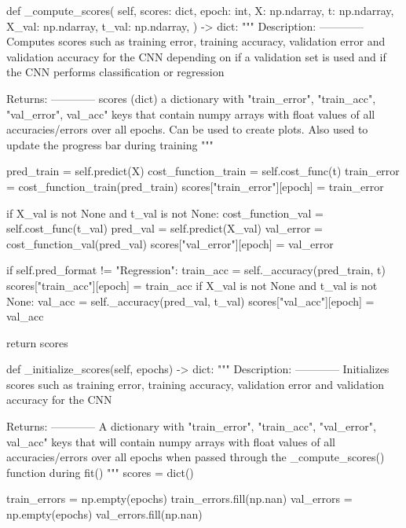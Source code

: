 \documentclass[%
oneside,                 %
final,                   %
10pt]{article}
\begin{document}
    def _compute_scores(
        self,
        scores: dict,
        epoch: int,
        X: np.ndarray,
        t: np.ndarray,
        X_val: np.ndarray,
        t_val: np.ndarray,
    ) -> dict:
        """
        Description:
        ------------
            Computes scores such as training error, training accuracy, validation error
            and validation accuracy for the CNN depending on if a validation set is used
            and if the CNN performs classification or regression

        Returns:
        ------------
            scores (dict) a dictionary with "train_error", "train_acc", "val_error", val_acc" keys
            that contain numpy arrays with float values of all accuracies/errors over all epochs.
            Can be used to create plots. Also used to update the progress bar during training
        """

        pred_train = self.predict(X)
        cost_function_train = self.cost_func(t)
        train_error = cost_function_train(pred_train)
        scores["train_error"][epoch] = train_error

        if X_val is not None and t_val is not None:
            cost_function_val = self.cost_func(t_val)
            pred_val = self.predict(X_val)
            val_error = cost_function_val(pred_val)
            scores["val_error"][epoch] = val_error

        if self.pred_format != "Regression":
            train_acc = self._accuracy(pred_train, t)
            scores["train_acc"][epoch] = train_acc
            if X_val is not None and t_val is not None:
                val_acc = self._accuracy(pred_val, t_val)
                scores["val_acc"][epoch] = val_acc

        return scores

    def _initialize_scores(self, epochs) -> dict:
        """
        Description:
        ------------
            Initializes scores such as training error, training accuracy, validation error
            and validation accuracy for the CNN

        Returns:
        ------------
            A dictionary with "train_error", "train_acc", "val_error", val_acc" keys that
            will contain numpy arrays with float values of all accuracies/errors over all epochs
            when passed through the _compute_scores() function during fit()
        """
        scores = dict()

        train_errors = np.empty(epochs)
        train_errors.fill(np.nan)
        val_errors = np.empty(epochs)
        val_errors.fill(np.nan)
\end{document}
